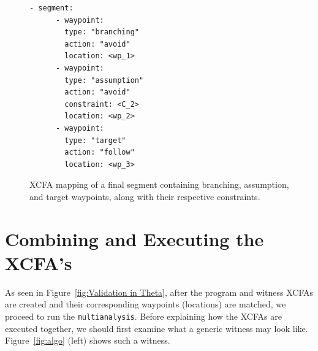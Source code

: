 \begin{figure}[H]
  \centering
  \begin{minipage}[t]{0.35\textwidth}
    \begin{lstlisting}[style=c, columns=flexibl]
    - segment:
      - waypoint:
        type: "branching"
        action: "avoid"
        location: <wp_1>
      - waypoint:
        type: "assumption"
        action: "avoid"
        constraint: <C_2>
        location: <wp_2>
      - waypoint:
        type: "target"
        action: "follow"
        location: <wp_3>
    \end{lstlisting}
    \end{minipage}
  \caption{XCFA mapping of a final segment containing branching, assumption, and target waypoints, along with their respective constraints.}
  \label{fig:combined}
\end{figure}


\section{Combining and Executing the XCFA's}
\label{sec:xcfa_product}
As seen in Figure~\ref{fig:Validation in Theta}, after the program and witness XCFAs are created and their 
corresponding waypoints (locations) are matched, we proceed to run the \texttt{multianalysis}. 
Before explaining how the XCFAs are executed together, we should first examine what 
a generic witness may look like. Figure~\ref{fig:algo} (left) shows such a witness.

